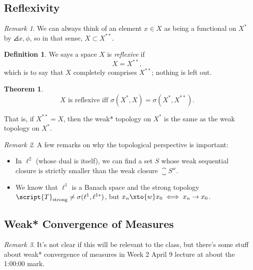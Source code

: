 \documentclass[a5paper]{article}
\theoremstyle{definition}%
\newtheorem*{theorem*}{Theorem} %
\newtheorem*{definition*}{Definition}
\numberwithin{exercise}{section}
\theoremstyle{remark}%
\newtheorem*{remark*}{Remark}
\begin{document}

\subsection{Reflexivity}

\begin{remark*}
We can always think of an element $x\in X$ as being a functional on $X^*$ by $\angles{x,\phi}$, so in that sense, $X\subset X^{**}$. 
\end{remark*}

\begin{highlight}
\begin{definition*}
We says a space $X$ is \emph{reflexive} if 
$$X=X^{**},$$ 
which is to say that $X$ completely comprises $X^{**}$; nothing is left out.
\end{definition*}
\end{highlight}

\begin{highlight}
\begin{theorem*}\mbox{}
$$X\text{ is reflexive iff }\sigma(X^*,X)=\sigma(X^*,X^{**}).$$

That is, if $X^{**}=X$, then the weak* topology on $X^*$ is the same as the weak topology on $X^*$. 
\end{theorem*}
\end{highlight}

\begin{remark*}
A few remarks on why the topological perspective is important:
	\begin{itemize}
	\item In $\ell^2$ (whose dual is itself), we can find a set $S$ whose weak sequential closure is strictly smaller than the weak closure $\closure{S}^w$. 
	\item We know that $\ell^1$ is a Banach space and the strong topology $\script{T}_{\text{strong}}\neq\sigma(\ell^1,\ell^{1*})$, but $x_n\xto{w}x_0 \iff x_n\to x_0$. 
	\end{itemize}
\end{remark*}

\subsection{Weak* Convergence of Measures}

\begin{remark*}
It's not clear if this will be relevant to the class, but there's some stuff about weak* convergence of measures in Week 2 April 9 lecture at about the 1:00:00 mark. 
\end{remark*}
\end{document}
